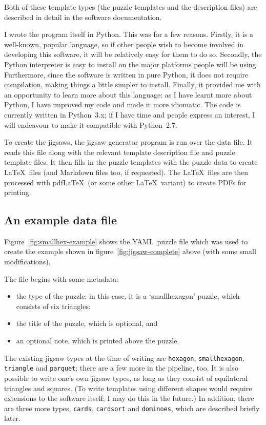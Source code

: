 \documentclass{article}
\def\YAML{{\small YAML}}
\def\PDF{{\small PDF}}
\begin{document}
Both of these template types (the puzzle templates and the description
files) are described in detail in the software documentation.

I wrote the program itself in Python.  This was for a few reasons.
Firstly, it is a well-known, popular language, so if other people wish
to become involved in developing this software, it will be relatively
easy for them to do so.  Secondly, the Python interpreter is easy to
install on the major platforms people will be using.  Furthermore,
since the software is written in pure Python, it does not require
compilation, making things a little simpler to install.  Finally, it
provided me with an opportunity to learn more about this language: as
I have learnt more about Python, I have improved my code and made it
more idiomatic.  The code is currently written in Python~3.x; if I
have time and people express an interest, I will endeavour to make it
compatible with Python~2.7.

To create the jigsaws, the jigsaw generator program is run over the
data file.  It reads this file along with the relevant template
description file and puzzle template files.  It then fills in the
puzzle templates with the puzzle data to create \LaTeX\ files (and
Markdown files too, if requested).  The \LaTeX\ files are then
processed with pdf\LaTeX\ (or some other \LaTeX\ variant) to create
\PDF s for printing.

\subsection{An example data file}

Figure~\ref{fig:smallhex-example} shows the \YAML\ puzzle file which
was used to create the example shown in
figure~\ref{fig:jigsaw-complete} above (with some small
modifications).

The file begins with some metadata:
\begin{itemize}
\item the type of the puzzle: in this case, it is a `smallhexagon'
  puzzle, which consists of six triangles;
\item the title of the puzzle, which is optional, and
\item an optional note, which is printed above the puzzle.
\end{itemize}

The existing jigsaw types at the time of writing are \texttt{hexagon},
\texttt{smallhexagon}, \texttt{triangle} and \texttt{parquet}; there are a few more in the
pipeline, too.  It is also possible to write one's own jigsaw types,
as long as they consist of equilateral triangles and squares.  (To
write templates using different shapes would require extensions to the
software itself; I may do this in the future.)  In addition, there are
three more types, \texttt{cards}, \texttt{cardsort} and \texttt{dominoes}, which are described
briefly later.
\end{document}
